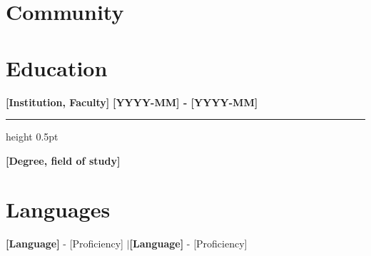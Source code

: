\documentclass[10pt,a4paper]{article}
\newcommand{\jobheading}[2]{%
  \vspace{5pt}%
  {\color{accentcolor}\textbf{#1}} \hfill \textbf{#2}%
  \vspace{-4pt}%
  \\{\color{lightrule}\hrule height 0.5pt}%
  \vspace{2pt}%
}
\newcommand{\jobtitle}[1]{\textbf{#1}}
\begin{document}
\section{Community}

\section{Education}
\jobheading{[Institution, Faculty]}{[YYYY-MM] - [YYYY-MM]}
\jobtitle{[Degree, field of study]}

\section{Languages}
\textbf{[Language]} - [Proficiency] \quad$|$\quad \textbf{[Language]} - [Proficiency]
\end{document}
